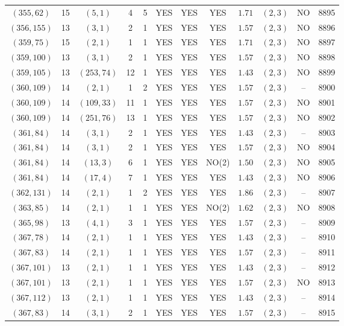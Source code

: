\begin{longtable}{|c|c|c|c|c|c|c|c|c|c|c|c|}
$(355,62)$ & 15 & $(5,1)$ & 4 & 5 & YES & YES & YES & $1.71$ & $(2,3)$ & NO & 8895\\
$(356,155)$ & 13 & $(3,1)$ & 2 & 1 & YES & YES & YES & $1.57$ & $(2,3)$ & NO & 8896\\
$(359,75)$ & 15 & $(2,1)$ & 1 & 1 & YES & YES & YES & $1.71$ & $(2,3)$ & NO & 8897\\
$(359,100)$ & 13 & $(3,1)$ & 2 & 1 & YES & YES & YES & $1.57$ & $(2,3)$ & NO & 8898\\
$(359,105)$ & 13 & $(253,74)$ & 12 & 1 & YES & YES & YES & $1.43$ & $(2,3)$ & NO & 8899\\
$(360,109)$ & 14 & $(2,1)$ & 1 & 2 & YES & YES & YES & $1.57$ & $(2,3)$ & -- & 8900\\
$(360,109)$ & 14 & $(109,33)$ & 11 & 1 & YES & YES & YES & $1.57$ & $(2,3)$ & NO & 8901\\
$(360,109)$ & 14 & $(251,76)$ & 13 & 1 & YES & YES & YES & $1.57$ & $(2,3)$ & NO & 8902\\
$(361,84)$ & 14 & $(3,1)$ & 2 & 1 & YES & YES & YES & $1.43$ & $(2,3)$ & -- & 8903\\
$(361,84)$ & 14 & $(3,1)$ & 2 & 1 & YES & YES & YES & $1.57$ & $(2,3)$ & NO & 8904\\
$(361,84)$ & 14 & $(13,3)$ & 6 & 1 & YES & YES & NO(2) & $1.50$ & $(2,3)$ & NO & 8905\\
$(361,84)$ & 14 & $(17,4)$ & 7 & 1 & YES & YES & YES & $1.43$ & $(2,3)$ & NO & 8906\\
$(362,131)$ & 14 & $(2,1)$ & 1 & 2 & YES & YES & YES & $1.86$ & $(2,3)$ & -- & 8907\\
$(363,85)$ & 14 & $(2,1)$ & 1 & 1 & YES & YES & NO(2) & $1.62$ & $(2,3)$ & NO & 8908\\
$(365,98)$ & 13 & $(4,1)$ & 3 & 1 & YES & YES & YES & $1.57$ & $(2,3)$ & -- & 8909\\
$(367,78)$ & 14 & $(2,1)$ & 1 & 1 & YES & YES & YES & $1.43$ & $(2,3)$ & -- & 8910\\
$(367,83)$ & 14 & $(2,1)$ & 1 & 1 & YES & YES & YES & $1.57$ & $(2,3)$ & -- & 8911\\
$(367,101)$ & 13 & $(2,1)$ & 1 & 1 & YES & YES & YES & $1.43$ & $(2,3)$ & -- & 8912\\
$(367,101)$ & 13 & $(2,1)$ & 1 & 1 & YES & YES & YES & $1.57$ & $(2,3)$ & NO & 8913\\
$(367,112)$ & 13 & $(2,1)$ & 1 & 1 & YES & YES & YES & $1.43$ & $(2,3)$ & -- & 8914\\
$(367,83)$ & 14 & $(3,1)$ & 2 & 1 & YES & YES & YES & $1.57$ & $(2,3)$ & -- & 8915\\

\end{longtable}
